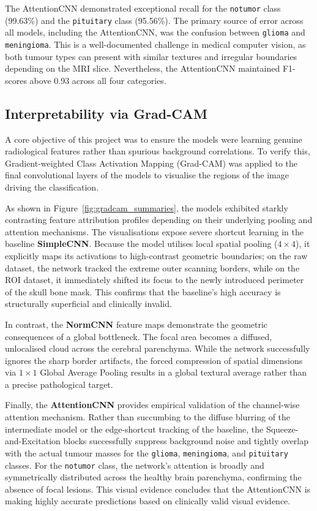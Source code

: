 \documentclass{article}
\begin{document}
The AttentionCNN demonstrated exceptional recall for the \texttt{notumor} class (99.63\%) and the \texttt{pituitary} class (95.56\%). The primary source of error across all models, including the AttentionCNN, was the confusion between \texttt{glioma} and \texttt{meningioma}. This is a well-documented challenge in medical computer vision, as both tumour types can present with similar textures and irregular boundaries depending on the MRI slice. Nevertheless, the AttentionCNN maintained F1-scores above 0.93 across all four categories.

\subsection{Interpretability via Grad-CAM}
\label{sec:gradcam}

A core objective of this project was to ensure the models were learning genuine radiological features rather than spurious background correlations. To verify this, Gradient-weighted Class Activation Mapping (Grad-CAM) was applied to the final convolutional layers of the models to visualise the regions of the image driving the classification.

As shown in Figure~\ref{fig:gradcam_summaries}, the models exhibited starkly contrasting feature attribution profiles depending on their underlying pooling and attention mechanisms. The visualisations expose severe shortcut learning in the baseline \textbf{SimpleCNN}. Because the model utilises local spatial pooling ($4 \times 4$), it explicitly maps its activations to high-contrast geometric boundaries; on the raw dataset, the network tracked the extreme outer scanning borders, while on the ROI dataset, it immediately shifted its focus to the newly introduced perimeter of the skull bone mask. This confirms that the baseline's high accuracy is structurally superficial and clinically invalid.

In contrast, the \textbf{NormCNN} feature maps demonstrate the geometric consequences of a global bottleneck. The focal area becomes a diffused, unlocalised cloud across the cerebral parenchyma. While the network successfully ignores the sharp border artifacts, the forced compression of spatial dimensions via $1 \times 1$ Global Average Pooling results in a global textural average rather than a precise pathological target.

Finally, the \textbf{AttentionCNN} provides empirical validation of the channel-wise attention mechanism. Rather than succumbing to the diffuse blurring of the intermediate model or the edge-shortcut tracking of the baseline, the Squeeze-and-Excitation blocks successfully suppress background noise and tightly overlap with the actual tumour masses for the \texttt{glioma}, \texttt{meningioma}, and \texttt{pituitary} classes. For the \texttt{notumor} class, the network's attention is broadly and symmetrically distributed across the healthy brain parenchyma, confirming the absence of focal lesions. This visual evidence concludes that the AttentionCNN is making highly accurate predictions based on clinically valid visual evidence.
\end{document}
